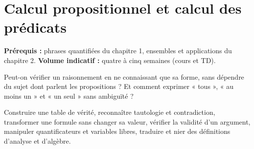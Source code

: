 \chapter{Calcul propositionnel et calcul des prédicats}
\label{chap:calcul}
\begin{flushleft}\small\sffamily
\textbf{Prérequis :} phrases quantifiées du chapitre 1, ensembles et applications du chapitre 2.\qquad
\textbf{Volume indicatif :} quatre à cinq semaines (cours et TD).
\end{flushleft}
\begin{questionfondatrice}
Peut-on vérifier un raisonnement en ne connaissant que sa forme, sans dépendre du sujet dont parlent les propositions ? Et comment exprimer « tous », « au moins un » et « un seul » sans ambiguïté ?
\end{questionfondatrice}
\begin{objectifs}
Construire une table de vérité, reconnaître tautologie et contradiction, transformer une formule sans changer sa valeur, vérifier la validité d'un argument, manipuler quantificateurs et variables libres, traduire et nier des définitions d'analyse et d'algèbre.
\end{objectifs}


